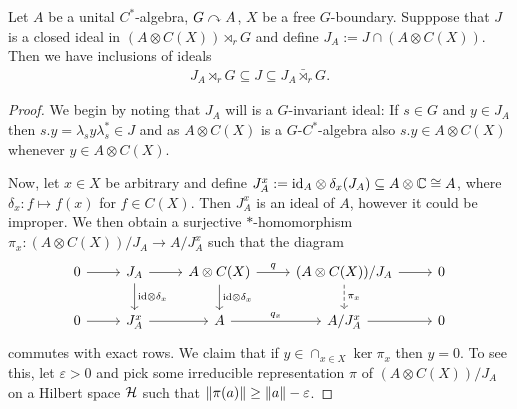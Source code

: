 \begin{proposition}
	Let $A$ be a unital $C^*$-algebra, $G \stackrel{}{\curvearrowright} {A}$, $X$ be a free $G$-boundary. Supppose that $J$ is a closed ideal in $(A \otimes C(X)) \rtimes_r G$ and define $J_A := J \cap (A \otimes C(X))$. Then we have inclusions of ideals
	\begin{align*}
		 J_A \rtimes_r G \subseteq J \subseteq J_A \bar \rtimes_r G.
	\end{align*}
	\label{ozawprop18}
\end{proposition}
\begin{proof}
	We begin by noting that $J_A$ will is a $G$-invariant ideal: If $s \in G$ and $y \in J_A$ then $s.y = \lambda_s y \lambda_s^*  \in J$ and as $A \otimes C(X)$ is a $G$-$C^*$-algebra also $s.y \in A \otimes C(X)$ whenever $y \in A \otimes C(X)$.
	
	Now, let $x \in X$ be arbitrary and define $J_A^x := \mathrm{id}_A \otimes \delta_x(J_A) \subseteq A \otimes \mathbb{C} \cong A$, where $\delta_x \colon f \mapsto f(x)$ for $f \in C(X)$. Then $J_A^x$ is an ideal of $A$, however it could be improper. We then obtain a surjective $*$-homomorphism $\pi_x \colon (A \otimes C(X)) / J_A \to A / J_A^x$ such that the diagram
	\begin{equation*}
		\begin{tikzcd}
			0 \ar[r] & J_A \ar[r] \ar[d, "\mathrm{id}\otimes \delta_x"] & A \otimes C(X) \ar[d, "\mathrm{id}\otimes \delta_x"] \ar[r,"q"] &(A \otimes C(X)) /J_A \ar[r] \ar[d,dashed, "\pi_x"] & 0\\
			0 \ar[r] & J_A^x \ar[r] & A \ar[r, "q_x"] & A/J_A^x \ar[r] & 0
		\end{tikzcd}
	\end{equation*}
	commutes with exact rows. We claim that if $y \in \cap_{x \in X} \ker \pi_x$ then $y = 0$. To see this, let $\varepsilon > 0$ and pick some irreducible representation $\pi$ of $(A \otimes C(X))/J_A$ on a Hilbert space $\mathcal{H}$ such that $\left\lVert \pi(a) \right\rVert \geq \left\lVert a \right\rVert - \varepsilon$.
	

\end{proof}
